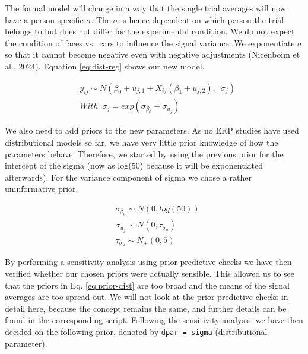 \documentclass[
  doc,12pt,floatsintext]{apa7}
\begin{document}
The formal model will change in a way that the single trial averages will now have a person-specific \(\sigma\). The \(\sigma\) is hence dependent on which person the trial belongs to but does not differ for the experimental condition. We do not expect the condition of faces vs.~cars to influence the signal variance. We exponentiate \(\sigma\) so that it cannot become negative even with negative adjustments (Nicenboim et al., 2024). Equation \eqref{eq:dist-reg} shows our new model.

\begin{equation}
\begin{split}
& y_{ij} \sim N(\beta_0 + u_{j,1} + X_{ij}(\beta_1 + u_{j,2}), \enspace \sigma_j) \\
& With \enspace \sigma_j = exp(\sigma_{\beta_0} + \sigma_{u_j})
\end{split}
\label{eq:dist-reg}
\end{equation}

We also need to add priors to the new parameters. As no ERP studies have used distributional models so far, we have very little prior knowledge of how the parameters behave. Therefore, we started by using the previous prior for the intercept of the sigma (now as log(50) because it will be exponentiated afterwards). For the variance component of sigma we chose a rather uninformative prior.

\begin{equation}
\begin{split}
& \sigma_{\beta_0} \sim N(0, log(50)) \\
& \sigma_{u_j} \sim N(0, \tau_{\sigma_u}) \\
& \tau_{\sigma_u} \sim N_{+}(0,5)
\end{split}
\label{eq:prior-dist}
\end{equation}

By performing a sensitivity analysis using prior predictive checks we have then verified whether our chosen priors were actually sensible. This allowed us to see that the priors in Eq. \eqref{eq:prior-dist} are too broad and the means of the signal averages are too spread out. We will not look at the prior predictive checks in detail here, because the concept remains the same, and further details can be found in the corresponding script. Following the sensitivity analysis, we have then decided on the following prior, denoted by \texttt{dpar\ =\ sigma} (distributional parameter).
\end{document}
